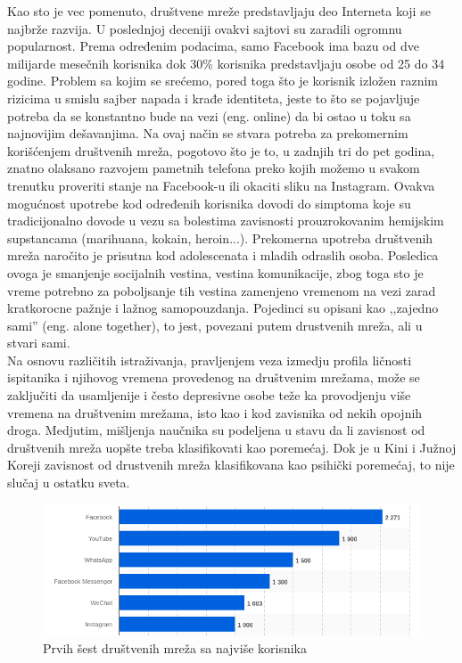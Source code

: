\documentclass[a4paper]{article}
\newtheorem{primer}{Primer}[section]
\begin{document}
\indent\indent Kao sto je vec pomenuto, društvene mreže predstavljaju deo Interneta koji se najbrže razvija. U poslednjoj deceniji ovakvi sajtovi su zaradili ogromnu popularnost. Prema određenim podacima, samo Facebook ima bazu od dve milijarde mesečnih korisnika dok 30\% korisnika predstavljaju osobe od 25 do 34 godine.\cite{socialN} Problem sa kojim se srećemo, pored toga što je korisnik izložen raznim rizicima u smislu sajber napada i krađe identiteta, jeste to što se pojavljuje potreba da se konstantno bude na vezi (eng. online) da bi ostao u toku sa najnovijim dešavanjima. Na ovaj način se stvara potreba za prekomernim korišćenjem društvenih mreža, pogotovo što je to, u zadnjih tri do pet godina, znatno olaksano razvojem pametnih telefona preko kojih možemo u svakom trenutku proveriti stanje na Facebook-u ili okaciti sliku na Instagram. Ovakva mogućnost upotrebe kod određenih korisnika dovodi do simptoma koje su tradicijonalno dovode u vezu sa bolestima zavisnosti prouzrokovanim hemijskim supstancama (marihuana, kokain, heroin...).  \cite{snsa} Prekomerna upotreba društvenih mreža naročito je prisutna kod adolescenata i mladih odraslih osoba. Posledica ovoga je smanjenje socijalnih vestina, vestina komunikacije, zbog toga sto je vreme potrebno za poboljsanje tih vestina zamenjeno vremenom na vezi zarad kratkorocne pažnje i lažnog samopouzdanja. Pojedinci su opisani kao ,,zajedno sami'' (eng. alone together), to jest, povezani putem drustvenih mreža, ali u stvari sami. \cite{turkle2017alone}
\\
\indent Na osnovu različitih istraživanja, pravljenjem veza izmedju profila ličnosti ispitanika i njihovog vremena provedenog na društvenim mrežama, može se zaključiti da usamljenije i često depresivne osobe teže ka provodjenju više vremena na društvenim mrežama, isto kao i kod zavisnika od nekih opojnih droga. Medjutim, mišljenja naučnika su podeljena u stavu da li zavisnost od društvenih mreža uopšte treba klasifikovati kao poremećaj. Dok je u Kini i Južnoj Koreji zavisnost od drustvenih mreža klasifikovana kao psihički poremećaj, to nije slučaj u ostatku sveta.
\\
\begin{figure}[h!]
\begin{center}
\includegraphics[scale=0.5]{top_6_networks.png}
\end{center}
\caption{Prvih šest društvenih mreža sa najviše korisnika}
\label{fig:top_networks}
\end{figure}
\end{document}
